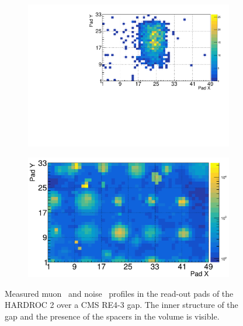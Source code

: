 	\begin{figure}[H]
		\begin{subfigure}{.5\linewidth}
		    \centering
			\includegraphics[width = \linewidth]{fig/chapt6/Muon-Profile-RE4-HARDROC.pdf}
			\caption{\label{fig:HARDROC2-profiles:A}}
		\end{subfigure}
		\begin{subfigure}{.5\linewidth}
		    \centering
			\includegraphics[width = \linewidth]{fig/chapt6/Noise-Profile-RE4-HARDROC.pdf}
			\caption{\label{fig:HARDROC2-profiles:B}}
		\end{subfigure}
		\caption{\label{fig:HARDROC2-profiles} Measured muon~ and noise~ profiles in the read-out pads of the HARDROC 2 over a CMS RE4-3 gap. The inner structure of the gap and the presence of the spacers in the volume is visible.}
    \end{figure}
	
